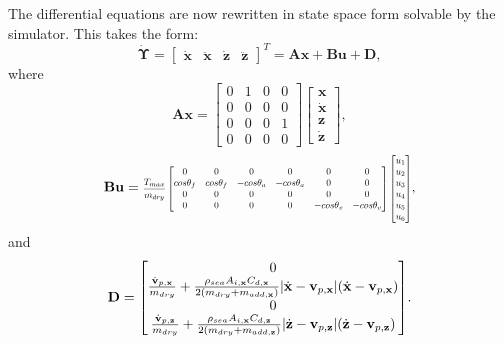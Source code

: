 \documentclass[letterpaper, 10 pt, conferences]{IEEEconf}  %
\DeclarePairedDelimiter\abs{\lvert}{\rvert}%
\newcommand\scalemath[2]{\scalebox{#1}{\mbox{\ensuremath{\displaystyle #2}}}}
\renewcommand{\vec}[1]{\mathbf{#1}}
\begin{document}
The differential equations are now rewritten in state space form solvable by the simulator. This takes the form:
\begin{equation}
\dot{\vec{\Upsilon}} = \begin{bmatrix} \dot{\vec{x}} & \ddot{\vec{x}} & \dot{\vec{z}} & \ddot{\vec{z}}\end{bmatrix}^T = \vec{A}\vec{x} + \vec{B}\vec{u} + \vec{D},
\label{eqn:SS_all}
\end{equation}
where
\begin{equation}
\vec{A}\vec{x} = \begin{bmatrix} 0 & 1 & 0 & 0 \\ 0 & 0 & 0 & 0 \\ 0 & 0 & 0 & 1 \\ 0 & 0 & 0 & 0  \end{bmatrix} \begin{bmatrix} \vec{x} \\ \dot{\vec{x}} \\ \vec{z} \\ \dot{\vec{z}} \end{bmatrix},
\label{eqn:SS_A}
\end{equation}
\begin{equation} 
\vec{B}\vec{u} = \scalemath{0.67}{ \frac{T_{max}}{m_{dry}} \begin{bmatrix} 0 & 0 & 0 & 0 & 0 & 0 \\ cos\theta_f & cos\theta_f & -cos\theta_a & -cos\theta_a & 0 & 0 \\ 0 & 0 & 0 & 0 & 0 & 0 \\ 0 & 0 & 0 & 0 & -cos\theta_v & -cos\theta_v \end{bmatrix} \begin{bmatrix} u_1 \\ u_2 \\ u_3 \\ u_4 \\ u_5 \\ u_6 \end{bmatrix} },
\label{eqn:SS_B}
\end{equation}
and
\begin{equation} 
\vec{D} = \scalemath{0.99}{\begin{bmatrix} 0 \\ \frac{\dot{\vec{v}}_{p,\vec{x}}}{m_{dry}} + \frac{\rho_{sea} A_{i,\vec{x}} C_{d,\vec{x}}}{2(m_{dry}+m_{add,\vec{x}})} \abs{\dot{\vec{x}}-\vec{v}_{p,\vec{x}}} (\dot{\vec{x}}-\vec{v}_{p,\vec{x}})  \\ 0 \\ \frac{\dot{\vec{v}}_{p,\vec{z}}}{m_{dry}} + \frac{\rho_{sea} A_{i,\vec{x}} C_{d,\vec{z}}}{2(m_{dry}+m_{add,\vec{z}})} \abs{\dot{\vec{z}}-\vec{v}_{p,\vec{z}}} (\dot{\vec{z}}-\vec{v}_{p,\vec{z}}) \end{bmatrix}}. 
\label{eqn:SS_D}
\end{equation}
\end{document}
